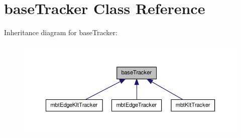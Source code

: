 \hypertarget{classbaseTracker}{\section{base\-Tracker \-Class \-Reference}
\label{classbaseTracker}
}


\-Inheritance diagram for base\-Tracker\-:\nopagebreak
\begin{figure}[H]
\begin{center}
\leavevmode
\includegraphics[width=350pt]{classbaseTracker__inherit__graph}
\end{center}
\end{figure}
